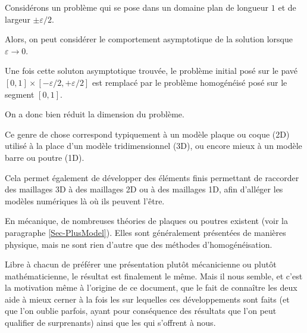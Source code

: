 \medskip
Considérons un problème qui se pose dans un domaine plan de longueur $1$ et de largeur
$\pm\varepsilon/2$.

Alors, on peut considérer le comportement asymptotique de la solution lorsque $\varepsilon \longrightarrow 0$.

Une fois cette soluton asymptotique trouvée, le problème initial posé sur le pavé 
$[0,1]\times[-\varepsilon/2,+\varepsilon/2]$ est remplacé par le problème homogénéisé
posé sur le segment $[0,1]$.

On a donc bien réduit la dimension du problème.

\medskip
Ce genre de chose correspond typiquement à un modèle plaque ou coque (2D) utilisé à la place
d'un modèle tridimensionnel (3D), ou encore mieux à un modèle barre ou poutre (1D).

Cela permet également de développer des éléments finis permettant de raccorder
des maillages 3D à des maillages 2D ou à des maillages 1D, afin d'alléger les modèles numériques
là où ils peuvent l'être.

\medskip
En mécanique, de nombreuses théories de plaques ou poutres existent (voir la paragraphe \ref{Sec-PlusModel}).
Elles sont généralement présentées de manières \og physique\fg{}, mais ne sont rien d'autre que des 
méthodes d'homogénéisation.

Libre à chacun de préférer une présentation plutôt mécanicienne ou plutôt mathématicienne,
le résultat est finalement le même. Mais il nous semble, et c'est la motivation même à l'origine de
ce document, que le fait de connaître les deux aide à mieux cerner à la fois les 
sur lequelles ces développements sont faits (et que l'on oublie parfois, ayant pour conséquence
des résultats que l'on peut qualifier de surprenants) ainsi que les  qui s'offrent 
à nous.




